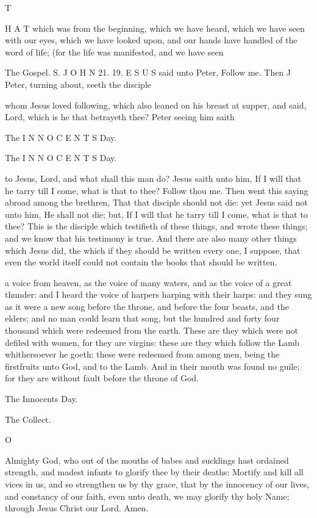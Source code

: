 T

H A T which was from the beginning, which we have heard, which we have seen with our eyes, which we have looked upon, and our hands have handled of the word of life; (for the life was manifested, and we have seen

The Gospel. S. J O H N 21. 19. E S U S said unto Peter, Follow me. Then J Peter, turning about, seeth the disciple

whom Jesus loved following, which also leaned on his breast at supper, and said, Lord, which is he that betrayeth thee? Peter seeing him saith

The I N N O C E N T S Day.

The I N N O C E N T S Day.

to Jesus, Lord, and what shall this man do? Jesus saith unto him, If I will that he tarry till I come, what is that to thee? Follow thou me. Then went this saying abroad among the brethren, That that disciple should not die: yet Jesus said not unto him, He shall not die; but, If I will that he tarry till I come, what is that to thee? This is the disciple which testifieth of these things, and wrote these things; and we know that his testimony is true. And there are also many other things which Jesus did, the which if they should be written every one, I suppose, that even the world itself could not contain the books that should be written.

a voice from heaven, as the voice of many waters, and as the voice of a great thunder: and I heard the voice of harpers harping with their harps: and they sung as it were a new song before the throne, and before the four beasts, and the elders; and no man could learn that song, but the hundred and forty four thousand which were redeemed from the earth. These are they which were not defiled with women, for they are virgins: these are they which follow the Lamb whithersoever he goeth: these were redeemed from among men, being the firstfruits unto God, and to the Lamb. And in their mouth was found no guile; for they are without fault before the throne of God.

The Innocents Day.

The Collect.

O

Almighty God, who out of the mouths of babes and sucklings hast ordained strength, and madest infants to glorify thee by their deaths: Mortify and kill all vices in us, and so strengthen us by thy grace, that by the innocency of our lives, and constancy of our faith, even unto death, we may glorify thy holy Name; through Jesus Christ our Lord. Amen.

